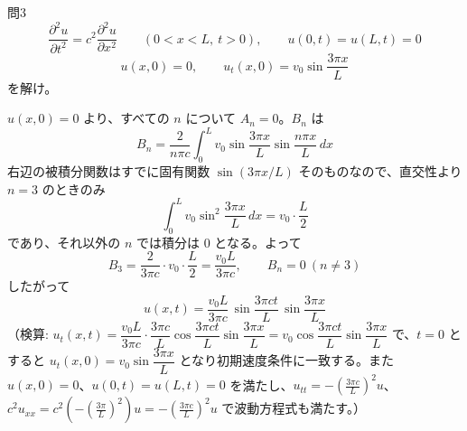 \documentclass[a4paper,11pt]{article}
\begin{document}
\clearpage
\begin{mondaiboxS}{問3}
\[
\frac{\partial^{2} u}{\partial t^{2}} = c^{2}\frac{\partial^{2} u}{\partial x^{2}} \qquad (0 < x < L,\ t > 0), \qquad u(0,t)=u(L,t)=0
\]
\[
u(x,0) = 0, \qquad u_{t}(x,0) = v_{0}\sin\frac{3\pi x}{L}
\]
を解け。
\end{mondaiboxS}
\kaitou
$u(x,0)=0$ より、すべての $n$ について $A_{n}=0$。$B_{n}$ は
\[
B_{n} = \frac{2}{n\pi c}\int_{0}^{L} v_{0}\sin\frac{3\pi x}{L}\sin\frac{n\pi x}{L}\,dx
\]
右辺の被積分関数はすでに固有関数 $\sin(3\pi x/L)$ そのものなので、直交性より $n=3$ のときのみ
\[
\int_{0}^{L} v_{0}\sin^{2}\frac{3\pi x}{L}\,dx = v_{0}\cdot\frac{L}{2}
\]
であり、それ以外の $n$ では積分は $0$ となる。よって
\[
B_{3} = \frac{2}{3\pi c}\cdot v_{0}\cdot\frac{L}{2} = \frac{v_{0}L}{3\pi c}, \qquad B_{n} = 0\ (n \neq 3)
\]
したがって
\[
\boxed{\; u(x,t) = \frac{v_{0}L}{3\pi c}\,\sin\frac{3\pi c t}{L}\,\sin\frac{3\pi x}{L} \;}
\]
（検算: $u_{t}(x,t) = \dfrac{v_{0}L}{3\pi c}\cdot\dfrac{3\pi c}{L}\cos\dfrac{3\pi ct}{L}\sin\dfrac{3\pi x}{L} = v_{0}\cos\dfrac{3\pi ct}{L}\sin\dfrac{3\pi x}{L}$ で、$t=0$ とすると $u_{t}(x,0) = v_{0}\sin\dfrac{3\pi x}{L}$ となり初期速度条件に一致する。また $u(x,0)=0$、$u(0,t)=u(L,t)=0$ を満たし、$u_{tt} = -\left(\frac{3\pi c}{L}\right)^2 u$、$c^2 u_{xx} = c^2\left(-\left(\frac{3\pi}{L}\right)^2\right)u = -\left(\frac{3\pi c}{L}\right)^2 u$ で波動方程式も満たす。）
\end{document}
